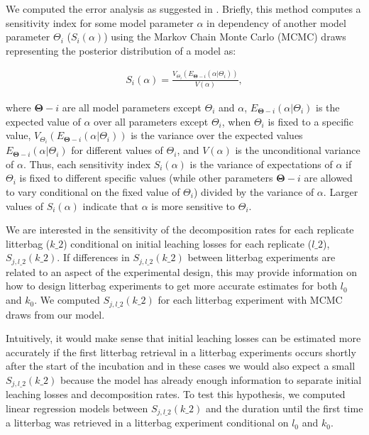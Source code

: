 \documentclass[bg, manuscript]{copernicus}
\begin{document}
We computed the error analysis as suggested in \citet{Eriksson.2019}. Briefly, this method computes a sensitivity index for some model parameter \(\alpha\) in dependency of another model parameter \(\Theta_i\) (\(S_i(\alpha)\)) using the Markov Chain Monte Carlo (MCMC) draws representing the posterior distribution of a model as:

\begin{equation}
\begin{aligned}
S_i(\alpha) = \frac{V_{\Theta_i}(E_{\bm{{\Theta}}-i}(\alpha|\Theta_i))}{V(\alpha)},
\label{eq:eriksson2019-1}
\end{aligned}
\end{equation}

where \(\bm{{\Theta}}-i\) are all model parameters except \(\Theta_i\) and \(\alpha\), \(E_{\bm{{\Theta}}-i}(\alpha|\Theta_i)\) is the expected value of \(\alpha\) over all parameters except \(\Theta_i\), when \(\Theta_i\) is fixed to a specific value, \(V_{\Theta_i}(E_{\bm{{\Theta}}-i}(\alpha|\Theta_i))\) is the variance over the expected values \(E_{\bm{{\Theta}}-i}(\alpha|\Theta_i)\) for different values of \(\Theta_i\), and \(V(\alpha)\) is the unconditional variance of \(\alpha\). Thus, each sensitivity index \(S_i(\alpha)\) is the variance of expectations of \(\alpha\) if \(\Theta_i\) is fixed to different specific values (while other parameters \(\bm{{\Theta}}-i\) are allowed to vary conditional on the fixed value of \(\Theta_i\)) divided by the variance of \(\alpha\). Larger values of \(S_i(\alpha)\) indicate that \(\alpha\) is more sensitive to \(\Theta_i\).

We are interested in the sensitivity of the decomposition rates for each replicate litterbag (\(k\_2\)) conditional on initial leaching losses for each replicate (\(l\_2\)), \(S_{j, l\_2}(k\_2)\). If differences in \(S_{j, l\_2}(k\_2)\) between litterbag experiments are related to an aspect of the experimental design, this may provide information on how to design litterbag experiments to get more accurate estimates for both \(l_0\) and \(k_0\). We computed \(S_{j, l\_2}(k\_2)\) for each litterbag experiment with MCMC draws from our model.

Intuitively, it would make sense that initial leaching losses can be estimated more accurately if the first litterbag retrieval in a litterbag experiments occurs shortly after the start of the incubation and in these cases we would also expect a small \(S_{j, l\_2}(k\_2)\) because the model has already enough information to separate initial leaching losses and decomposition rates. To test this hypothesis, we computed linear regression models between \(S_{j, l\_2}(k\_2)\) and the duration until the first time a litterbag was retrieved in a litterbag experiment conditional on \(l_0\) and \(k_0\).
\end{document}
